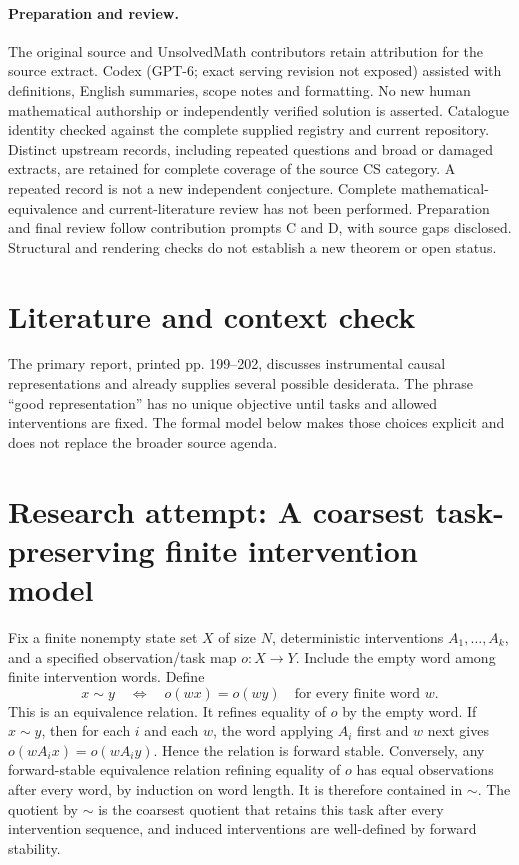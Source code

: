 \documentclass[11pt]{article}
\begin{document}
\paragraph{Preparation and review.}
The original source and UnsolvedMath contributors retain attribution for the source extract. Codex (GPT-6; exact serving revision not exposed) assisted with definitions, English summaries, scope notes and formatting. No new human mathematical authorship or independently verified solution is asserted. Catalogue identity checked against the complete supplied registry and current repository. Distinct upstream records, including repeated questions and broad or damaged extracts, are retained for complete coverage of the source CS category. A repeated record is not a new independent conjecture. Complete mathematical-equivalence and current-literature review has not been performed. Preparation and final review follow contribution prompts C and D, with source gaps disclosed. Structural and rendering checks do not establish a new theorem or open status.
\label{end:statement}

\section{Literature and context check}
The primary report, printed pp. 199--202, discusses instrumental causal representations and already supplies several possible desiderata. The phrase ``good representation'' has no unique objective until tasks and allowed interventions are fixed. The formal model below makes those choices explicit and does not replace the broader source agenda.
\section{Research attempt: A coarsest task-preserving finite intervention model}

Fix a finite nonempty state set $X$ of size $N$, deterministic interventions $A_1,\ldots,A_k$, and a specified observation/task map $o:X\to Y$. Include the empty word among finite intervention words. Define
\[
x\sim y\quad\Longleftrightarrow\quad o(w x)=o(w y)
\quad\text{for every finite word }w.
\]
This is an equivalence relation. It refines equality of $o$ by the empty word. If $x\sim y$, then for each $i$ and each $w$, the word applying $A_i$ first and $w$ next gives $o(w A_i x)=o(w A_i y)$. Hence the relation is forward stable. Conversely, any forward-stable equivalence relation refining equality of $o$ has equal observations after every word, by induction on word length. It is therefore contained in $\sim$. The quotient by $\sim$ is the coarsest quotient that retains this task after every intervention sequence, and induced interventions are well-defined by forward stability.
\end{document}
